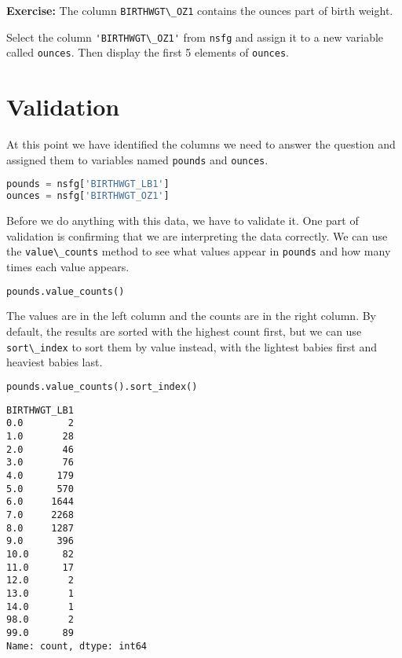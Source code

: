 \textbf{Exercise:} The column \passthrough{\lstinline!BIRTHWGT\_OZ1!}
contains the ounces part of birth weight.

Select the column \passthrough{\lstinline!'BIRTHWGT\_OZ1'!} from
\passthrough{\lstinline!nsfg!} and assign it to a new variable called
\passthrough{\lstinline!ounces!}. Then display the first 5 elements of
\passthrough{\lstinline!ounces!}.

\hypertarget{validation}{%
\section{Validation}\label{validation}}

At this point we have identified the columns we need to answer the
question and assigned them to variables named
\passthrough{\lstinline!pounds!} and \passthrough{\lstinline!ounces!}.

\begin{lstlisting}[language=Python,style=source]
pounds = nsfg['BIRTHWGT_LB1']
ounces = nsfg['BIRTHWGT_OZ1']
\end{lstlisting}

Before we do anything with this data, we have to validate it. One part
of validation is confirming that we are interpreting the data correctly.
We can use the \passthrough{\lstinline!value\_counts!} method to see
what values appear in \passthrough{\lstinline!pounds!} and how many
times each value appears.

\begin{lstlisting}[language=Python,style=source]
pounds.value_counts()
\end{lstlisting}

The values are in the left column and the counts are in the right
column. By default, the results are sorted with the highest count first,
but we can use \passthrough{\lstinline!sort\_index!} to sort them by
value instead, with the lightest babies first and heaviest babies last.

\begin{lstlisting}[language=Python,style=source]
pounds.value_counts().sort_index()
\end{lstlisting}

\begin{lstlisting}[style=output]
BIRTHWGT_LB1
0.0        2
1.0       28
2.0       46
3.0       76
4.0      179
5.0      570
6.0     1644
7.0     2268
8.0     1287
9.0      396
10.0      82
11.0      17
12.0       2
13.0       1
14.0       1
98.0       2
99.0      89
Name: count, dtype: int64
\end{lstlisting}

